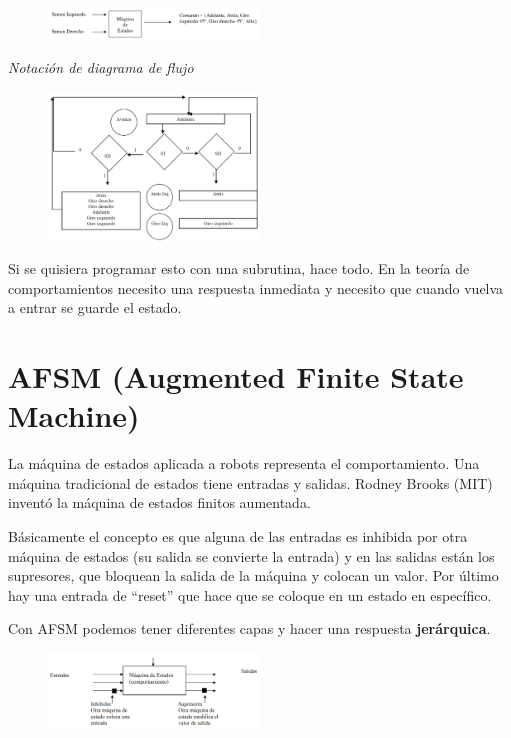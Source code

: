 \begin{figure}[h!]
	\centering
	\includegraphics[width=0.5\textwidth]{images/img55.png}
	\label{figura55}
\end{figure}


\textit{Notación de diagrama de flujo}


\begin{figure}[h!]
	\centering
	\includegraphics[width=0.5\textwidth]{images/img56.png}
	\label{figura56}
	
\end{figure}
\break

Si se quisiera programar esto con una subrutina, hace todo.  En la teoría de comportamientos necesito una respuesta inmediata y necesito que cuando vuelva a entrar se guarde el estado.

\section{AFSM (Augmented Finite State Machine)}

La máquina de estados aplicada a robots representa el comportamiento.
Una máquina tradicional de estados tiene entradas y salidas.
Rodney Brooks (MIT) inventó la máquina de estados finitos aumentada.

Básicamente el concepto es que alguna de las entradas es inhibida por otra máquina de estados (su salida se convierte la entrada) y en las salidas están los supresores, que bloquean la salida de la máquina y colocan un valor. Por último hay una entrada de “reset” que hace que se coloque en un estado en específico.

Con AFSM podemos tener diferentes capas y hacer una respuesta \textbf{jerárquica}.

\begin{figure}[h!]
	\centering
	\includegraphics[width=0.5\textwidth]{images/img57.png}
	\label{figura57}
	
\end{figure}
\break


